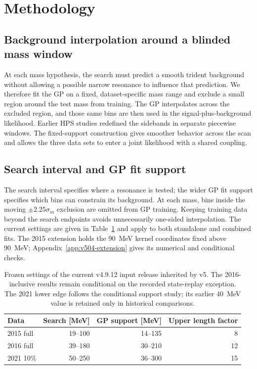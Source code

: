 \section{Methodology}
\label{sec:methodology}

\subsection{Background interpolation around a blinded mass window}

At each mass hypothesis, the search must predict a smooth trident background without
allowing a possible narrow resonance to influence that prediction. We therefore fit the
GP on a fixed, dataset-specific mass range and exclude a small region around the test
mass from training. The GP interpolates across the excluded region, and those same bins
are then used in the signal-plus-background likelihood. Earlier HPS studies redefined
the sidebands in separate piecewise windows. The fixed-support construction gives
smoother behavior across the scan and allows the three data sets to enter a joint
likelihood with a shared coupling.

\subsection{Search interval and GP fit support}
\label{sec:fit-support-policy}

The search interval specifies where a resonance is tested; the wider GP fit
support specifies which bins can constrain its background. At each mass, bins
inside the moving $\pm2.25\sigma_m$ exclusion are omitted from GP training.
Keeping training data beyond the search endpoints avoids unnecessarily
one-sided interpolation. The current settings are given in
Table~\ref{tab:v4p9-card-lineage} and apply to both standalone and combined fits.
The 2015 extension holds the 90~MeV kernel coordinates fixed above 90~MeV;
Appendix~\ref{app:v504-extension} gives its numerical and conditional checks.

\begin{table}[htbp]
\centering
\begin{tabular}{lrrr}
\toprule
Data & Search [MeV] & GP support [MeV] & Upper length factor \\
\midrule
2015 full & 19--100 & 14--135 & 8 \\
2016 full & 39--180 & 30--210 & 12 \\
2021 10\% & 50--250 & 36--300 & 15 \\
\bottomrule
\end{tabular}
\caption{Frozen settings of the current v4.9.12 input release inherited by v5.
The 2016-inclusive results remain conditional on the recorded state-replay
exception. The 2021 lower edge follows the conditional support study;
its earlier 40~MeV value is retained only in historical comparisons.}
\label{tab:v4p9-card-lineage}
\end{table}

